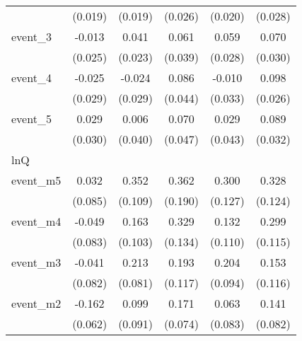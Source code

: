 {\begin{tabular}{l*{5}{c}}
            &     (0.019)         &     (0.019)         &     (0.026)         &     (0.020)         &     (0.028)         \\
[1em]
event\_3     &      -0.013         &       0.041         &       0.061         &       0.059\sym{*}  &       0.070\sym{*}  \\
            &     (0.025)         &     (0.023)         &     (0.039)         &     (0.028)         &     (0.030)         \\
[1em]
event\_4     &      -0.025         &      -0.024         &       0.086         &      -0.010         &       0.098\sym{***}\\
            &     (0.029)         &     (0.029)         &     (0.044)         &     (0.033)         &     (0.026)         \\
[1em]
event\_5     &       0.029         &       0.006         &       0.070         &       0.029         &       0.089\sym{**} \\
            &     (0.030)         &     (0.040)         &     (0.047)         &     (0.043)         &     (0.032)         \\
\hline
lnQ         &                     &                     &                     &                     &                     \\
event\_m5    &       0.032         &       0.352\sym{**} &       0.362         &       0.300\sym{*}  &       0.328\sym{**} \\
            &     (0.085)         &     (0.109)         &     (0.190)         &     (0.127)         &     (0.124)         \\
[1em]
event\_m4    &      -0.049         &       0.163         &       0.329\sym{*}  &       0.132         &       0.299\sym{**} \\
            &     (0.083)         &     (0.103)         &     (0.134)         &     (0.110)         &     (0.115)         \\
[1em]
event\_m3    &      -0.041         &       0.213\sym{**} &       0.193         &       0.204\sym{*}  &       0.153         \\
            &     (0.082)         &     (0.081)         &     (0.117)         &     (0.094)         &     (0.116)         \\
[1em]
event\_m2    &      -0.162\sym{**} &       0.099         &       0.171\sym{*}  &       0.063         &       0.141         \\
            &     (0.062)         &     (0.091)         &     (0.074)         &     (0.083)         &     (0.082)         \\

\end{tabular}}
